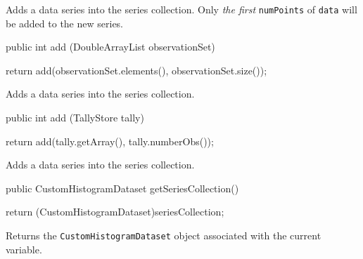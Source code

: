 \begin{tabb}
   Adds a data series into the series collection. Only \emph{the first}
  \texttt{numPoints} of \texttt{data} will be added to the new series.
\end{tabb}
\begin{htmlonly}
\end{htmlonly}
\begin{code}

   public int add (DoubleArrayList observationSet) \begin{hide} {
      return add(observationSet.elements(), observationSet.size());
   }\end{hide}
\end{code}
\begin{tabb}
   Adds a data series into the series collection.
\end{tabb}
\begin{htmlonly}
\end{htmlonly}
\begin{code}

   public int add (TallyStore tally) \begin{hide} {
      return add(tally.getArray(), tally.numberObs());
   }\end{hide}
\end{code}
\begin{tabb}
   Adds a data series into the series collection.
\end{tabb}
\begin{htmlonly}
\end{htmlonly}
\begin{code}

   public CustomHistogramDataset getSeriesCollection() \begin{hide} {
      return (CustomHistogramDataset)seriesCollection;
   }\end{hide}
\end{code}
\begin{tabb}
   Returns the \texttt{CustomHistogramDataset} object associated with the current variable.
\end{tabb}

